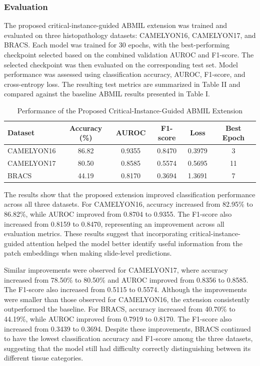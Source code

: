\documentclass[journal]{IEEEtran}
\begin{document}
\subsubsection{Evaluation}

The proposed critical-instance-guided ABMIL extension was trained and evaluated on three histopathology datasets: CAMELYON16, CAMELYON17, and BRACS. Each model was trained for 30 epochs, with the best-performing checkpoint selected based on the combined validation AUROC and F1-score. The selected checkpoint was then evaluated on the corresponding test set. Model performance was assessed using classification accuracy, AUROC, F1-score, and cross-entropy loss. The resulting test metrics are summarized in Table II and compared against the baseline ABMIL results presented in Table I.

\begin{table}[htbp]
\centering
\caption{Performance of the Proposed Critical-Instance-Guided ABMIL Extension}
\label{tab:extension_results}
\begin{tabular}{|l|c|c|c|c|c|}
\hline
\textbf{Dataset} & \textbf{Accuracy (\%)} & \textbf{AUROC} & \textbf{F1-score} & \textbf{Loss} & \textbf{Best Epoch} \\
\hline
CAMELYON16 & 86.82 & 0.9355 & 0.8470 & 0.3979 & 3 \\
\hline
CAMELYON17 & 80.50 & 0.8585 & 0.5574 & 0.5695 & 11 \\
\hline
BRACS & 44.19 & 0.8170 & 0.3694 & 1.3691 & 7 \\
\hline
\end{tabular}
\end{table}

The results show that the proposed extension improved classification performance across all three datasets. For CAMELYON16, accuracy increased from 82.95\% to 86.82\%, while AUROC improved from 0.8704 to 0.9355. The F1-score also increased from 0.8159 to 0.8470, representing an improvement across all evaluation metrics. These results suggest that incorporating critical-instance-guided attention helped the model better identify useful information from the patch embeddings when making slide-level predictions.

Similar improvements were observed for CAMELYON17, where accuracy increased from 78.50\% to 80.50\% and AUROC improved from 0.8356 to 0.8585. The F1-score also increased from 0.5115 to 0.5574. Although the improvements were smaller than those observed for CAMELYON16, the extension consistently outperformed the baseline. For BRACS, accuracy increased from 40.70\% to 44.19\%, while AUROC improved from 0.7919 to 0.8170. The F1-score also increased from 0.3439 to 0.3694. Despite these improvements, BRACS continued to have the lowest classification accuracy and F1-score among the three datasets, suggesting that the model still had difficulty correctly distinguishing between its different tissue categories.
\end{document}
